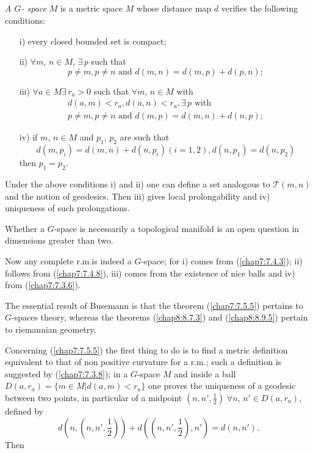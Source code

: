 \subsection{}\label{chap8:8.10.1}\pageoriginale
{\em A $G$- space} $M$ is a metric space $M$ whose distance map $d$
verifies the following conditions:
\begin{itemize}
\item[i)] every closed bounded set is compact;

\item[ii)] $\forall m$, $n\in M$, $\exists\, p$ such that
$$
p\neq m, p\neq n\text{ \ and \ } d(m,n)=d(m,p)+d(p,n);
$$

\item[iii)] $\forall a\in M\exists\, r_{a}>0$ such that $\forall m$,
  $n\in M$ with
\begin{gather*}
d(a,m)<r_{a}, d(a,n)<r_{a},\exists\, p\text{ \  with}\\
p\neq m, p\neq n\text{ \ and \ }d (m,p) = d(m,n)+d(n,p);
\end{gather*}

\item[iv)] if $m$, $n\in M$ and $p_{1}$, $p_{2}$ are such that
$$
d(m,p_{i})=d(m,n)+d(n,p_{i})(i=1,2),d(n,p_{1})=d(n,p_{2})
$$
then $p_{1}=p_{2}$.
\end{itemize}
Under the above conditions i) and ii) one can define a set analogous
to $\mathscr{T}(m,n)$ and the notion of geodesics. Then iii) gives
local prolongability and iv) uniqueness of such prolongations.

Whether a $G$-space is necessarily a topological manifold is an open
question in dimensions greater than two.

Now any complete r.m.\@ is indeed a $G$-space; for i) comes from
(\ref{chap7:7.4.3}); ii) follows from (\ref{chap7:7.4.8}), iii) comes from
the existence of nice balls and iv) from (\ref{chap7:7.3.6}).

The essential result of Busemann is that the theorem (\ref{chap7:7.5.5})
pertains to $G$-spaces theory, whereas the theorems (\ref{chap8:8.7.3}) and
(\ref{chap8:8.9.5}) pertain to riemannian geometry.

Concerning (\ref{chap7:7.5.5}) the first thing to do is to find a metric
definition equivalent to that of non positive curvature for a r.m.;
such a definition is suggested by (\ref{chap7:7.3.8}); in a $G$-space 
$M$ \pageoriginale and inside a ball $D(a,r_{a})=\{m\in
M|d(a,m)<r_{a}\}$ one proves the uniqueness of a geodesic between two
points, in particular of a midpoint $(n,n',\frac{1}{2}) \; \forall n$,
$n'\in D(a,r_{a})$, defined by
$$
d(n,(n,n',\frac{1}{2}))+d((n,n',\frac{1}{2}),n')=d(n,n').
$$
Then

